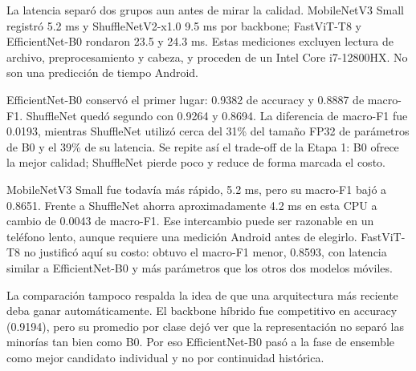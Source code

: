 La latencia separó dos grupos aun antes de mirar la calidad. MobileNetV3 Small
registró 5.2 ms y ShuffleNetV2-x1.0 9.5 ms por backbone; FastViT-T8 y
EfficientNet-B0 rondaron 23.5 y 24.3 ms. Estas mediciones excluyen lectura de
archivo, preprocesamiento y cabeza, y proceden de un Intel Core i7-12800HX. No
son una predicción de tiempo Android.

EfficientNet-B0 conservó el primer lugar: 0.9382 de accuracy y 0.8887 de
macro-F1. ShuffleNet quedó segundo con 0.9264 y 0.8694. La diferencia de
macro-F1 fue 0.0193, mientras ShuffleNet utilizó cerca del 31\% del tamaño FP32
de parámetros de B0 y el 39\% de su latencia. Se repite así el trade-off de la
Etapa 1: B0 ofrece la mejor calidad; ShuffleNet pierde poco y reduce de forma
marcada el costo.

MobileNetV3 Small fue todavía más rápido, 5.2 ms, pero su macro-F1 bajó a
0.8651. Frente a ShuffleNet ahorra aproximadamente 4.2 ms en esta CPU a cambio
de 0.0043 de macro-F1. Ese intercambio puede ser razonable en un teléfono
lento, aunque requiere una medición Android antes de elegirlo. FastViT-T8 no
justificó aquí su costo: obtuvo el macro-F1 menor, 0.8593, con latencia similar
a EfficientNet-B0 y más parámetros que los otros dos modelos móviles.

La comparación tampoco respalda la idea de que una arquitectura más reciente
deba ganar automáticamente. El backbone híbrido fue competitivo en accuracy
(0.9194), pero su promedio por clase dejó ver que la representación no separó
las minorías tan bien como B0. Por eso EfficientNet-B0 pasó a la fase de
ensemble como mejor candidato individual y no por continuidad histórica.
